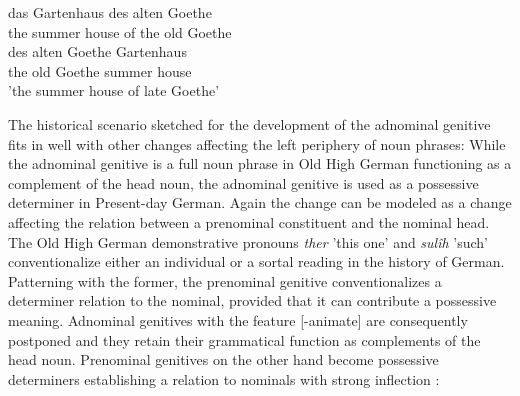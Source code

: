 \documentclass[output=paper]{langsci/langscibook}
\begin{document}
\eal
\ex
\gll das Gartenhaus des alten Goethe \\ the {summer house} {of the} old Goethe \\
\ex 
\gll *des alten Goethe Gartenhaus \\ the old Goethe {summer house} \\
\glt 'the summer house of late Goethe'
\zl

The historical scenario sketched for the development of the adnominal genitive fits in well with other changes affecting the left periphery of noun phrases: While the adnominal genitive is a full noun phrase in Old High German functioning as a complement of the head noun, the adnominal genitive is used as a possessive determiner in Present-day German. Again the change can be modeled as a change affecting the relation between a prenominal constituent and the nominal head. The Old High German demonstrative pronouns \textit{ther} 'this one' and \textit{sulîh} 'such' conventionalize either an individual or a sortal reading in the history of German. Patterning with the former, the prenominal genitive conventionalizes a determiner relation to the nominal, provided that it can contribute a possessive meaning. Adnominal genitives with the feature [-animate] are consequently postponed and they retain their grammatical function as complements of the head noun. Prenominal genitives on the other hand become possessive determiners   establishing a \spr relation to nominals with strong inflection \citep[54]{PoSa94}:
\ea 
{}
\z 
\end{document}
